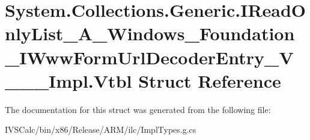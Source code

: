 \hypertarget{struct_system_1_1_collections_1_1_generic_1_1_i_read_only_list___a___windows___foundation___i_wwaeb122fef649d99e07514e50c897a378}{}\section{System.\+Collections.\+Generic.\+I\+Read\+Only\+List\+\_\+\+A\+\_\+\+Windows\+\_\+\+Foundation\+\_\+\+I\+Www\+Form\+Url\+Decoder\+Entry\+\_\+\+V\+\_\+\+\_\+\+\_\+\+Impl.\+Vtbl Struct Reference}
\label{struct_system_1_1_collections_1_1_generic_1_1_i_read_only_list___a___windows___foundation___i_wwaeb122fef649d99e07514e50c897a378}


The documentation for this struct was generated from the following file\+:\begin{DoxyCompactItemize}
\item 
I\+V\+S\+Calc/bin/x86/\+Release/\+A\+R\+M/ilc/Impl\+Types.\+g.\+cs\end{DoxyCompactItemize}
